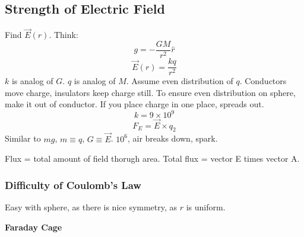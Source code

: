 \documentclass[article, 12pt]{article}
\theoremstyle{definition}
\begin{document}
    \subsection{Strength of Electric Field}
    Find $\overrightarrow{E}(r)$.
    Think:
    \begin{equation*}
      g = - \frac{GM}{r^2} \hat{r}
    \end{equation*}
    \begin{equation*}
      \overrightarrow{E}(r) = \frac{kq}{r^2}
    \end{equation*}
    $k$ is analog of $G$. $q$ is analog of $M$.
    Assume even distribution of $q$. 
    Conductors move charge, insulators keep charge still. To ensure even distribution on sphere, make it out of conductor. If you place charge in one place, spreads out. 
    \begin{equation}
       k = 9 \times 10^{9}
    \end{equation}
    \begin{equation}\label{eq:force of electric field}
       F_E = \overrightarrow{E} \times q_2
    \end{equation}
    Similar to $mg$, $m \equiv q$, $G \equiv \overrightarrow{E}$. $10^6$, air breaks down, spark.

    Flux = total amount of field thorugh area. 
    Total flux = vector E times vector A. 

    \subsubsection{Difficulty of Coulomb's Law}
    Easy with sphere, as there is nice symmetry, as $r$ is uniform. 

    \textbf{Faraday Cage}
\end{document}
